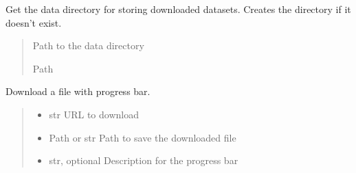 \documentclass[letterpaper,10pt,english]{sphinxmanual}
\begin{document}
\begin{fulllineitems}
\label{\detokenize{api_reference:graphem.datasets.get_data_directory}}
\pysigstartsignatures
{}
\pysigstopsignatures
\sphinxAtStartPar
Get the data directory for storing downloaded datasets.
Creates the directory if it doesn’t exist.
\begin{quote}\begin{description}
\sphinxAtStartPar
Path to the data directory

\sphinxAtStartPar
Path

\end{description}\end{quote}

\end{fulllineitems}


\begin{fulllineitems}
\label{\detokenize{api_reference:graphem.datasets.download_file}}
\pysigstartsignatures
{}
\pysigstopsignatures
\sphinxAtStartPar
Download a file with progress bar.
\begin{quote}\begin{description}
\begin{itemize}
\item {} 
\sphinxAtStartPar
{} \textendash{} str
URL to download

\item {} 
\sphinxAtStartPar
{} \textendash{} Path or str
Path to save the downloaded file

\item {} 
\sphinxAtStartPar
{} \textendash{} str, optional
Description for the progress bar

\end{itemize}

\end{description}\end{quote}

\end{fulllineitems}
\end{document}
